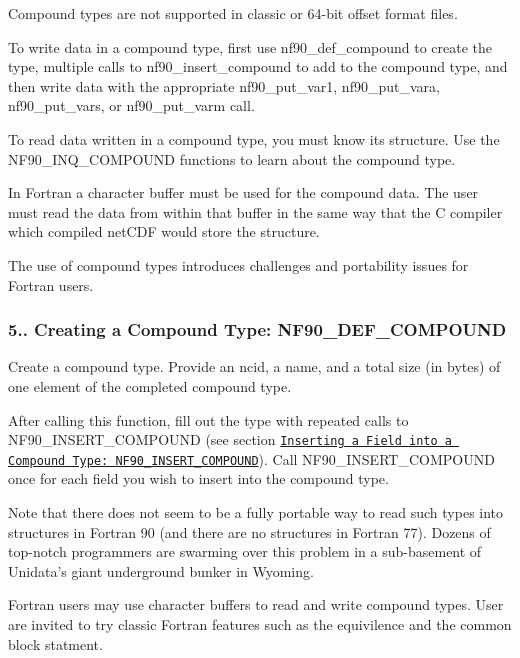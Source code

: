 Compound types are not supported in classic or 64-\/bit offset format files.

To write data in a compound type, first use nf90\+\_\+def\+\_\+compound to create the type, multiple calls to nf90\+\_\+insert\+\_\+compound to add to the compound type, and then write data with the appropriate nf90\+\_\+put\+\_\+var1, nf90\+\_\+put\+\_\+vara, nf90\+\_\+put\+\_\+vars, or nf90\+\_\+put\+\_\+varm call.

To read data written in a compound type, you must know its structure. Use the N\+F90\+\_\+\+I\+N\+Q\+\_\+\+C\+O\+M\+P\+O\+U\+ND functions to learn about the compound type.

In Fortran a character buffer must be used for the compound data. The user must read the data from within that buffer in the same way that the C compiler which compiled net\+C\+DF would store the structure.

The use of compound types introduces challenges and portability issues for Fortran users.\hypertarget{f90-user-defined-data-types_f90-creating-a-compound-type-nf90_def_compound}{}\subsubsection{5.. Creating a Compound Type\+: N\+F90\+\_\+\+D\+E\+F\+\_\+\+C\+O\+M\+P\+O\+U\+ND}\label{f90-user-defined-data-types_f90-creating-a-compound-type-nf90_def_compound}
Create a compound type. Provide an ncid, a name, and a total size (in bytes) of one element of the completed compound type.

After calling this function, fill out the type with repeated calls to N\+F90\+\_\+\+I\+N\+S\+E\+R\+T\+\_\+\+C\+O\+M\+P\+O\+U\+ND (see section \href{#NF90_005fINSERT_005fCOMPOUND}{\tt Inserting a Field into a Compound Type\+: N\+F90\+\_\+\+I\+N\+S\+E\+R\+T\+\_\+\+C\+O\+M\+P\+O\+U\+ND}). Call N\+F90\+\_\+\+I\+N\+S\+E\+R\+T\+\_\+\+C\+O\+M\+P\+O\+U\+ND once for each field you wish to insert into the compound type.

Note that there does not seem to be a fully portable way to read such types into structures in Fortran 90 (and there are no structures in Fortran 77). Dozens of top-\/notch programmers are swarming over this problem in a sub-\/basement of Unidata’s giant underground bunker in Wyoming.

Fortran users may use character buffers to read and write compound types. User are invited to try classic Fortran features such as the equivilence and the common block statment.

